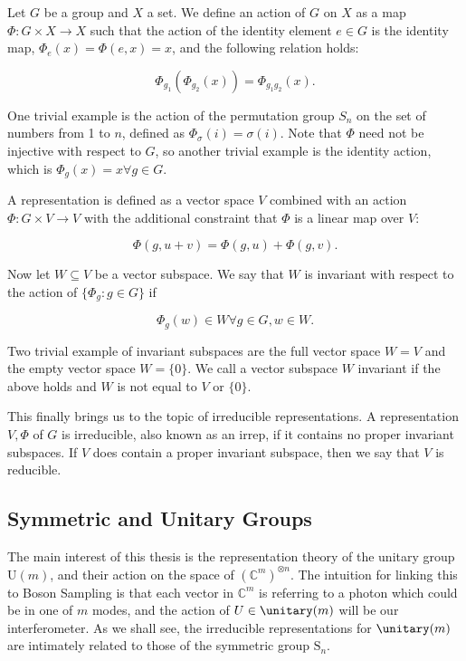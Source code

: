 Let $G$ be a group and $X$ a set. We define an action of $G$ on $X$ as a map $\Phi\colon G\times X \rightarrow X$ such that the action of the identity element $e\in G$ is the identity map, $\Phi_e(x) = \Phi(e, x) = x$, and the following relation holds:

\begin{equation}
\Phi_{g_1}(\Phi_{g_2}(x)) = \Phi_{g_1g_2}(x).
\end{equation}

One trivial example is the action of the permutation group $S_n$ on the set of numbers from 1 to $n$, defined as $\Phi_\sigma(i) = \sigma(i)$. Note that $\Phi$ need not be injective with respect to $G$, so another trivial example is the identity action, which is $\Phi_g(x) = x \forall g \in G$.

A representation is defined as a vector space $V$ combined with an action $\Phi: G \times V \rightarrow V$ with the additional constraint that $\Phi$ is a linear map over $V$:

\begin{equation}
\Phi(g, u+v) = \Phi(g, u) + \Phi(g, v).
\end{equation}

Now let $W \subseteq V$ be a vector subspace. We say that $W$ is invariant with respect to the action of $\{\Phi_g\colon g\in G\}$ if

\begin{equation}
\Phi_g(w) \in W \forall g \in G, w \in W.
\end{equation}

Two trivial example of invariant subspaces are the full vector space $W=V$ and the empty vector space $W=\{0\}$. We call a vector subspace $W$ invariant if the above holds and $W$ is not equal to $V$ or $\{0\}$.

This finally brings us to the topic of irreducible representations. A representation $V, \Phi$ of $G$ is irreducible, also known as an irrep, if it contains no proper invariant subspaces. If $V$ does contain a proper invariant subspace, then we say that $V$ is reducible.

\subsection{Symmetric and Unitary Groups}

The main interest of this thesis is the representation theory of the unitary group U$(m)$, and their action on the space of $(\mathbb{C}^{m})^{\otimes n}$. The intuition for linking this to Boson Sampling is that each vector in $\mathbb{C}^m$ is referring to a photon which could be in one of $m$ modes, and the action of $U \in \unitary(m)$ will be our interferometer.
As we shall see, the irreducible representations for $\unitary(m)$ are intimately related to those of the symmetric group $\textrm{S}_n$.


